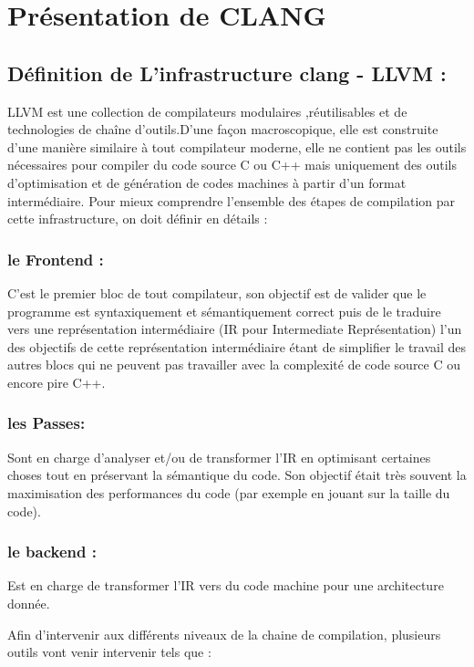 \documentclass[12pt,titlepage]{article}
\begin{document}
\section{Présentation de CLANG} 

\subsection{ Définition de  L’infrastructure clang - LLVM :}
LLVM est une collection de compilateurs modulaires ,réutilisables et de technologies de chaîne d'outils.D’une façon macroscopique, elle est construite d’une manière similaire à tout compilateur moderne, elle ne contient pas les outils nécessaires pour compiler du code source C ou C++ mais uniquement des outils d’optimisation et de génération de codes machines à partir d’un format intermédiaire. 
 Pour mieux comprendre l’ensemble des étapes de compilation par cette infrastructure,   on doit définir en détails :
       
     \subsubsection{  le Frontend : }
     C'est le premier bloc de tout compilateur, son objectif est de valider que le programme est syntaxiquement et sémantiquement correct puis de le traduire vers une représentation intermédiaire (IR pour Intermediate Représentation) l'un des objectifs de cette représentation intermédiaire étant de simplifier le travail des autres blocs qui ne peuvent pas travailler avec la complexité de code source C ou encore pire C++. 

     \subsubsection{ les Passes: }
     Sont en charge d’analyser et/ou de transformer l’IR en optimisant certaines choses tout en préservant la sémantique du code. Son objectif était très souvent la maximisation des performances du code (par exemple en jouant sur la taille du code).

    \subsubsection{ le backend :}
    Est en charge de transformer l’IR vers du code machine pour une architecture donnée.

Afin d’intervenir aux différents niveaux de la chaine de compilation, plusieurs outils vont venir intervenir tels que :
\end{document}
